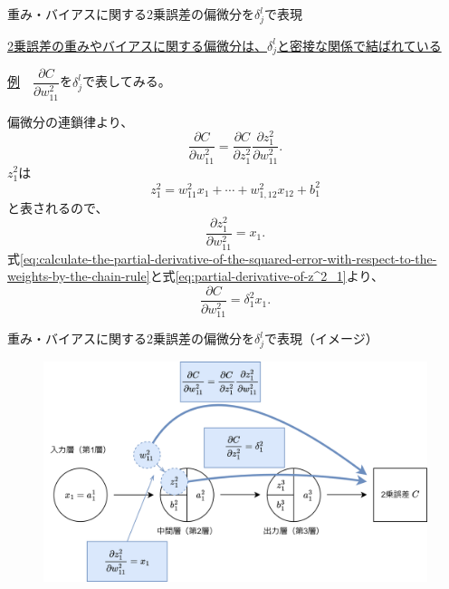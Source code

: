 \documentclass[dvipdfmx,aspectratio=169]{beamer}
\begin{document}
	\begin{frame}[shrink]{重み・バイアスに関する2乗誤差の偏微分を$ \delta^l_j $で表現}
		\begin{center}
			\underline{2乗誤差の重みやバイアスに関する偏微分は、$ \delta^l_j $と密接な関係で結ばれている}
		\end{center}
		
		\underline{例}　$ \dfrac{\partial C}{\partial w^2_{11}} $を$ \delta^l_j $で表してみる。
		
		偏微分の連鎖律より、
		\begin{equation}\label{eq:calculate-the-partial-derivative-of-the-squared-error-with-respect-to-the-weights-by-the-chain-rule}
			\dfrac{\partial C}{\partial w^2_{11}} = \dfrac{\partial C}{\partial z^2_1}\dfrac{\partial z^2_1}{\partial w^2_{11}}.
		\end{equation}
		$ z^2_1 $は
		\begin{equation*}
			z^2_1 = w^2_{11}x_1 + \cdots + w^2_{1,12}x_{12} + b^2_1
		\end{equation*}
		と表されるので、
		\begin{equation}\label{eq:partial-derivative-of-z^2_1}
			\dfrac{\partial z^2_1}{\partial w^2_{11}} = x_1.
		\end{equation}
		式\eqref{eq:calculate-the-partial-derivative-of-the-squared-error-with-respect-to-the-weights-by-the-chain-rule}と式\eqref{eq:partial-derivative-of-z^2_1}より、
		\begin{equation}\label{eq:denote-C-as-partial-derivative-of-w^2_11-in-unit-error}
			\dfrac{\partial C}{\partial w^2_{11}} = \delta^2_1 x_1.
		\end{equation}
	\end{frame}
	\begin{frame}{重み・バイアスに関する2乗誤差の偏微分を$ \delta^l_j $で表現（イメージ）}
		\begin{figure}
			\centering
			\includegraphics[width=0.9\linewidth]{img/image-of-the-partial-derivative-of-the-squared-error-with-respect-to-weights}
		\end{figure}
		
	\end{frame}
\end{document}
